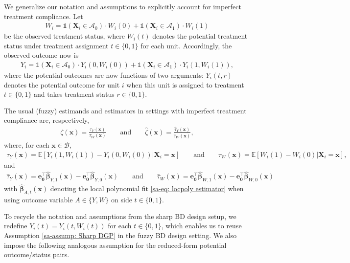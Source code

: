 \documentclass[10pt]{article}
\newcommand{\E}{\mathbb{E}}
\newcommand{\Indicator}{\mathds{1}}
\newcommand{\be}{\mathbf{e}}
\newcommand{\bx}{\mathbf{x}}
\newcommand{\bX}{\mathbf{X}}
\newcommand{\bbeta}{\boldsymbol{\beta}}
\newcommand{\A}{\mathcal{A}}
\newcommand{\B}{\mathcal{B}}
\begin{document}
We generalize our notation and assumptions to explicitly account for imperfect treatment compliance. Let
\begin{align*}
    W_i = \Indicator(\bX_i \in \A_0) \cdot W_i(0) + \Indicator(\bX_i \in \A_1) \cdot W_i(1)
\end{align*}
be the observed treatment status, where $W_i(t)$ denotes the potential treatment status under treatment assignment $t\in\{0,1\}$ for each unit. Accordingly, the observed outcome now is
\begin{align*}
    Y_i = \Indicator(\bX_i \in \A_0) \cdot Y_i(0,W_i(0)) + \Indicator(\bX_i \in \A_1) \cdot Y_i(1,W_i(1)),
\end{align*}
where the potential outcomes are now functions of two arguments: $Y_i(t,r)$ denotes the potential outcome for unit $i$ when this unit is assigned to treatment $t\in\{0,1\}$ and takes treatment status $r\in\{0,1\}$.

The usual (fuzzy) estimands and estimators in settings with imperfect treatment compliance are, respectively,
\begin{align*}
    \zeta(\bx) = \frac{\tau_{Y}(\bx)}{\tau_{W}(\bx)}
    \qquad\text{and}\qquad
    \widehat{\zeta}(\bx) = \frac{\widehat{\tau}_{Y}(\bx)}{\widehat{\tau}_{W}(\bx)},
\end{align*}
where, for each $\bx \in \B$,
\begin{align*}
    \tau_{Y}(\bx) = \E[Y_i(1,W_i(1)) - Y_i(0,W_i(0)) | \bX_i = \bx]
    \qquad\text{and}\qquad
    \tau_{W}(\bx) = \E[W_i(1) - W_i(0) | \bX_i = \bx],
\end{align*}
and
\begin{align*}
    \widehat{\tau}_{Y}(\bx) = \be_{\mathbf{0}}^{\top}\widehat{\bbeta}_{Y,1}(\bx) - \be_{\mathbf{0}}^{\top}\widehat{\bbeta}_{Y,0}(\bx)
    \qquad\text{and}\qquad
    \widehat{\tau}_{W}(\bx) = \be_{\mathbf{0}}^{\top}\widehat{\bbeta}_{W,1}(\bx) - \be_{\mathbf{0}}^{\top}\widehat{\bbeta}_{W,0}(\bx)
\end{align*}
with $\widehat{\bbeta}_{A,t}(\bx)$ denoting the local polynomial fit \eqref{sa-eq: locpoly estimator} when using outcome variable $A \in \{Y,W\}$ on side $t\in\{0,1\}$.

To recycle the notation and assumptions from the sharp BD design setup, we redefine $Y_i(t) = Y_i(t,W_i(t))$ for each $t\in\{0,1\}$, which enables us to reuse Assumption \ref{sa-assump: Sharp DGP} in the fuzzy BD design setting. We also impose the following analogous assumption for the reduced-form potential outcome/status pairs.
\end{document}

